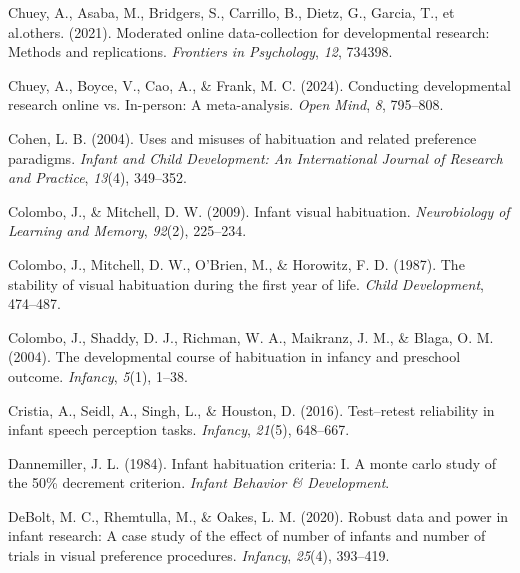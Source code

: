 \documentclass[10pt, letterpaper]{article}
\newenvironment{CSLReferences}%
  {}%
  {\par}
\begin{document}
\begin{CSLReferences}{1}{0}
\leavevmode{}%
Chuey, A., Asaba, M., Bridgers, S., Carrillo, B., Dietz, G., Garcia, T.,
et al.others. (2021). Moderated online data-collection for developmental
research: Methods and replications. \emph{Frontiers in Psychology},
\emph{12}, 734398.

\leavevmode{}%
Chuey, A., Boyce, V., Cao, A., \& Frank, M. C. (2024). Conducting
developmental research online vs. In-person: A meta-analysis. \emph{Open
Mind}, \emph{8}, 795--808.

\leavevmode{}%
Cohen, L. B. (2004). Uses and misuses of habituation and related
preference paradigms. \emph{Infant and Child Development: An
International Journal of Research and Practice}, \emph{13}(4), 349--352.

\leavevmode{}%
Colombo, J., \& Mitchell, D. W. (2009). Infant visual habituation.
\emph{Neurobiology of Learning and Memory}, \emph{92}(2), 225--234.

\leavevmode{}%
Colombo, J., Mitchell, D. W., O'Brien, M., \& Horowitz, F. D. (1987).
The stability of visual habituation during the first year of life.
\emph{Child Development}, 474--487.

\leavevmode{}%
Colombo, J., Shaddy, D. J., Richman, W. A., Maikranz, J. M., \& Blaga,
O. M. (2004). The developmental course of habituation in infancy and
preschool outcome. \emph{Infancy}, \emph{5}(1), 1--38.

\leavevmode{}%
Cristia, A., Seidl, A., Singh, L., \& Houston, D. (2016). Test--retest
reliability in infant speech perception tasks. \emph{Infancy},
\emph{21}(5), 648--667.

\leavevmode{}%
Dannemiller, J. L. (1984). Infant habituation criteria: I. A monte carlo
study of the 50\% decrement criterion. \emph{Infant Behavior \&
Development}.

\leavevmode{}%
DeBolt, M. C., Rhemtulla, M., \& Oakes, L. M. (2020). Robust data and
power in infant research: A case study of the effect of number of
infants and number of trials in visual preference procedures.
\emph{Infancy}, \emph{25}(4), 393--419.


\end{CSLReferences}
\end{document}
